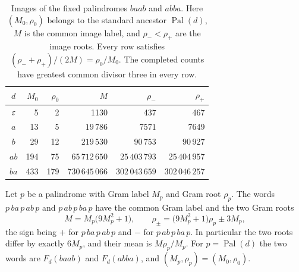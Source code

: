 \begin{table}[tb]
\centering
\caption{Images of the fixed palindromes $baab$ and $abba$. Here
$(M_0,\rho_0)$ belongs to the standard ancestor $\operatorname{Pal}(d)$,
$M$ is the common image label, and $\rho_-<\rho_+$ are the image
roots. Every row satisfies $(\rho_-+\rho_+)/(2M)=\rho_0/M_0$.
The completed counts have greatest common divisor three in every row.}
\label{tab:pairs}
\small
\setlength{\tabcolsep}{9pt}
\renewcommand{\arraystretch}{1.12}
\begin{tabular}{@{}crrrrr@{}}
\toprule
$d$ & $M_0$ & $\rho_0$ & $M$ & $\rho_-$ & $\rho_+$ \\
\midrule
$\varepsilon$ & 5 & 2 & 1130 & 437 & 467 \\
$a$ & 13 & 5 & $19\,786$ & 7571 & 7649 \\
$b$ & 29 & 12 & $219\,530$ & $90\,753$ & $90\,927$ \\
$ab$ & 194 & 75 & $65\,712\,650$ & $25\,403\,793$ & $25\,404\,957$ \\
$ba$ & 433 & 179 & $730\,645\,066$ & $302\,043\,659$ & $302\,046\,257$ \\
\bottomrule
\end{tabular}
\end{table}

\begin{proposition}
\label{prop:one-block-closed-form}
Let $p$ be a palindrome with Gram label $M_p$ and Gram root $\rho_p$. The words
$p\,ba\,p\,ab\,p$ and $p\,ab\,p\,ba\,p$ have the common Gram label and the two Gram roots
\begin{equation}\label{eq:one-block-closed-form}
 M=M_p\bigl(9M_p^2+1\bigr),
 \qquad
 \rho_\pm=\bigl(9M_p^2+1\bigr)\rho_p\pm3M_p ,
\end{equation}
the sign being $+$ for $p\,ba\,p\,ab\,p$ and $-$ for $p\,ab\,p\,ba\,p$. In particular the two
roots differ by exactly $6M_p$, and their mean is $M\rho_p/M_p$. For $p=\operatorname{Pal}(d)$
the two words are $F_d(baab)$ and $F_d(abba)$, and $(M_p,\rho_p)=(M_0,\rho_0)$.
\end{proposition}

